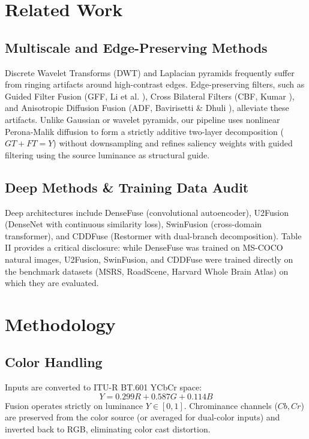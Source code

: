 \documentclass[conference]{IEEEtran}
\begin{document}
\section{Related Work}
\subsection{Multiscale and Edge-Preserving Methods}
Discrete Wavelet Transforms (DWT) and Laplacian pyramids frequently suffer from ringing artifacts around high-contrast edges. Edge-preserving filters, such as Guided Filter Fusion (GFF, Li et al. \cite{ref_gff}), Cross Bilateral Filters (CBF, Kumar \cite{ref_cbf}), and Anisotropic Diffusion Fusion (ADF, Bavirisetti \& Dhuli \cite{ref_bavirisetti}), alleviate these artifacts. Unlike Gaussian or wavelet pyramids, our pipeline uses nonlinear Perona-Malik diffusion to form a strictly additive two-layer decomposition ($GT + FT = Y$) without downsampling and refines saliency weights with guided filtering using the source luminance as structural guide.

\subsection{Deep Methods \& Training Data Audit}
Deep architectures include DenseFuse \cite{ref_densefuse} (convolutional autoencoder), U2Fusion \cite{ref_u2fusion} (DenseNet with continuous similarity loss), SwinFusion \cite{ref_swinfusion} (cross-domain transformer), and CDDFuse \cite{ref_cddfuse} (Restormer with dual-branch decomposition). Table II provides a critical disclosure: while DenseFuse was trained on MS-COCO natural images, U2Fusion, SwinFusion, and CDDFuse were trained directly on the benchmark datasets (MSRS, RoadScene, Harvard Whole Brain Atlas) on which they are evaluated.

\section{Methodology}
\subsection{Color Handling}
Inputs are converted to ITU-R BT.601 YCbCr space:
\begin{equation}
Y = 0.299 R + 0.587 G + 0.114 B
\end{equation}
Fusion operates strictly on luminance $Y \in [0, 1]$. Chrominance channels ($Cb, Cr$) are preserved from the color source (or averaged for dual-color inputs) and inverted back to RGB, eliminating color cast distortion.
\end{document}
